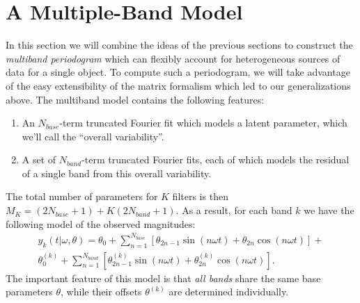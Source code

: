 \documentclass{emulateapj}
\newcommand{\eqlabel}[1]{\label{eq:#1}}
\newcommand{\sectlabel}[1]{\label{sect:#1}}
\begin{document}
\section{A Multiple-Band Model}
\sectlabel{multiband}
In this section we will combine the ideas of the previous sections to construct the {\it multiband periodogram} which can flexibly account for heterogeneous sources of data for a single object.
To compute such a periodogram, we will take advantage of the easy extensibility of the matrix formalism which led to our generalizations above.
The multiband model contains the following features:
\begin{enumerate}
  \item An $N_{base}$-term truncated Fourier fit which models a latent parameter, which we'll call the ``overall variability''.
  \item A set of $N_{band}$-term truncated Fourier fits, each of which models the residual of a single band from this overall variability.
\end{enumerate}
The total number of parameters for $K$ filters is then $M_K = (2N_{base} + 1) + K(2N_{band} + 1)$. As a result, for each band $k$ we have the following model of the observed magnitudes:
\begin{eqnarray}
  \eqlabel{multiband_model}
  &y_k(t|\omega,\theta) =
  \theta_0 + \sum_{n=1}^{N_{base}} \left[\theta_{2n - 1}\sin(n\omega t) + \theta_{2n}\cos(n\omega t)\right] +&\nonumber\\ 
  &\theta^{(k)}_0 + \sum_{n=1}^{N_{band}} \left[\theta^{(k)}_{2n - 1}\sin(n\omega t) + \theta^{(k)}_{2n}\cos(n\omega t)\right].&
\end{eqnarray}
The important feature of this model is that {\it all bands} share the same base parameters $\theta$, while their offsets $\theta^{(k)}$ are determined individually.
\end{document}
